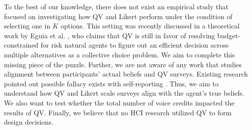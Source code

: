 To the best of our knowledge,
there does not exist an empirical study 
that focused on investigating
how QV and Likert perform
under the condition of selecting
one in $K$ options.
This setting was recently discussed 
in a theoretical work by Eguia et al. \cite{eguia2019quadratic},
who claims that QV is still in favor 
of resolving budget-constrained 
for risk natural agents
to figure out an efficient decision 
across multiple alternatives
as a collective choice problem.
We aim to complete this missing piece of the puzzle.
Further,
we are not aware of any work
that studies alignment between
participants' actual beliefs
and QV surveys.
Existing research pointed out 
possible fallacy exists with self-reporting
\cite{araujo2017much, vavreck2007exaggerated}.
Thus, we aim to understand
how QV and Likert scale surveys
align with the agent's true beliefs.
We also want to test
whether the total number of voice credits 
impacted the results of QV.
Finally, we believe that
no HCI research utilized QV
to form design decisions.